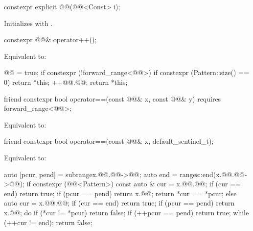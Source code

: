 %
\begin{itemdecl}
constexpr explicit @@(@@<Const> i);
\end{itemdecl}

\begin{itemdescr}
\pnum
\effects
Initializes  with .
\end{itemdescr}

%
\begin{itemdecl}
constexpr @@& operator++();
\end{itemdecl}

\begin{itemdescr}
\pnum
\effects
Equivalent to:
\begin{codeblock}
@@ = true;
if constexpr (!forward_range<@@>) {
  if constexpr (Pattern::size() == 0) {
    return *this;
  }
}
++@@.@@;
return *this;
\end{codeblock}
\end{itemdescr}

%
\begin{itemdecl}
friend constexpr bool operator==(const @@& x, const @@& y)
  requires forward_range<@@>;
\end{itemdecl}

\begin{itemdescr}
\pnum
\effects
Equivalent to: 
\end{itemdescr}

%
\begin{itemdecl}
friend constexpr bool operator==(const @@& x, default_sentinel_t);
\end{itemdecl}

\begin{itemdescr}
\pnum
\effects
Equivalent to:
\begin{codeblock}
auto [pcur, pend] = subrange{x.@@.@@->@@};
auto end = ranges::end(x.@@.@@->@@);
if constexpr (@@<Pattern>) {
  const auto & cur = x.@@.@@;
  if (cur == end) return true;
  if (pcur == pend) return x.@@;
  return *cur == *pcur;
} else {
  auto cur = x.@@.@@;
  if (cur == end) return true;
  if (pcur == pend) return x.@@;
  do {
    if (*cur != *pcur) return false;
    if (++pcur == pend) return true;
  } while (++cur != end);
  return false;
}
\end{codeblock}
\end{itemdescr}

